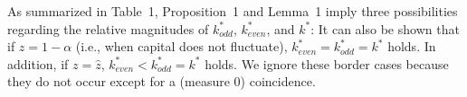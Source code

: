 \documentclass{MBE}%
\begin{document}
{%

As summarized in Table~1, Proposition~1 and Lemma~1 imply three possibilities regarding the
relative magnitudes of $k_{odd}^{\ast}$, $k_{even}^{\ast}$, and \noindent$k^{\ast}$: {It can also
be shown that if $z=1-\alpha$ (i.e., when capital does not fluctuate),
$k_{even}^{\ast}=k_{odd}^{\ast}=k^{\ast}$
holds. In addition, if $z=\widehat z$, $k_{even}^{\ast}<k_{odd}^{\ast}%
=k^{\ast}$ holds. We ignore these border cases because they do not occur
except for a (measure 0) coincidence.}


}
\end{document}
